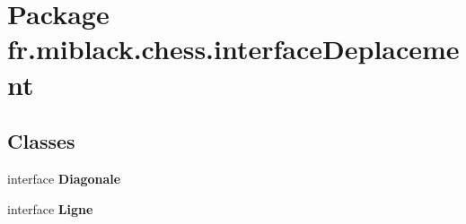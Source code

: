 \section{Package fr.\-miblack.\-chess.\-interface\-Deplacement}
\label{namespacefr_1_1miblack_1_1chess_1_1interfaceDeplacement}
\subsection*{Classes}
\begin{DoxyCompactItemize}
\item 
interface {\bf Diagonale}
\item 
interface {\bf Ligne}
\end{DoxyCompactItemize}
